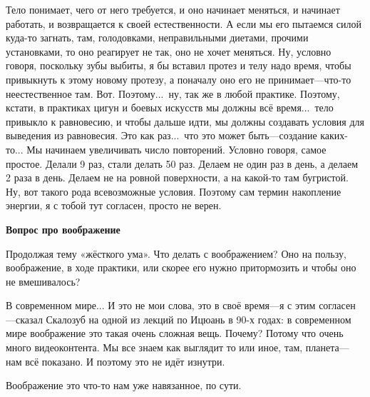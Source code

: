 \T
Тело понимает, чего от него требуется, и оно начинает меняться, и начинает работать, и
возвращается к своей естественности. А если мы его пытаемся силой куда-то загнать, там,
голодовками, неправильными диетами, прочими установками, то оно реагирует не так, оно не
хочет меняться. Ну, условно говоря, поскольку зубы выбиты, я бы вставил протез и телу надо
время, чтобы
привыкнуть к этому новому протезу, а поначалу оно его не принимает---что-то неестественное
там. Вот. Поэтому...\ ну, так же в любой практике.
Поэтому, кстати, в практиках цигун и боевых искусств мы должны всё время...\ тело привыкло к
равновесию, и чтобы дальше идти, мы должны создавать условия для выведения из равновесия.
Это как раз...\ что это может быть---создание каких-то... Мы начинаем увеличивать число повторений.
Условно говоря, самое простое. Делали 9 раз, стали делать 50 раз. Делаем не один раз в день, а
делаем 2 раза в день. Делаем не на ровной поверхности, а на какой-то там бугристой. Ну, вот
такого рода всевозможные условия. Поэтому сам термин накопление энергии, я с тобой тут
согласен, просто не верен.

\null
\centerline{\bf Вопрос про воображение}
\null

\A
Продолжая тему «жёсткого ума». Что делать с воображением?
Оно на пользу, воображение, в ходе практики, или скорее его нужно притормозить и чтобы оно не
вмешивалось?

\T
В современном мире... И это не мои слова, это в своё время---я с этим согласен---сказал Скалозуб
на одной из лекций по Ицюань в 90-х годах: в современном мире воображение
это такая очень сложная вещь. Почему? Потому что
очень много видеоконтента. Мы все знаем как выглядит то или иное,
там, планета---нам всё
показано. И поэтому это не идёт изнутри.

\A
Воображение это что-то нам уже навязанное, по сути.

